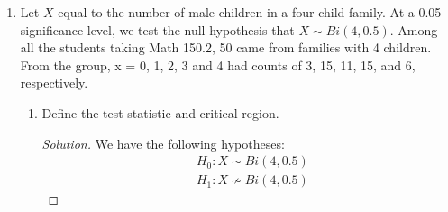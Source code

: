 \documentclass[12pt]{exam}
\begin{document}
\begin{enumerate}
    \begin{proof}[Solution]
        We have the following hypotheses:
        \begin{align*}
            &H_0: \sigma^2 - 140^2 = 0
            \\&H_1: \sigma^2 - 140^2 \neq 0
        \end{align*}
        Using MATLAB {\selectfont randi} function\(^1\), we got the following pseudorandom numbers: 479, 483, 78, 486, 479, 243, 400, and 71. 

        Solving for \(s^2\), we have
        \begin{align*}
            n &= 8
            \\\overline{x} &= 339.875
            \\s^2 &= \dfrac{1}{7}\sum_{i=1}^8 (x_i - 339.875)^2 = 33488.696
        \end{align*}
        Hence, the \(\chi^2-\)statistic is
        \begin{align*}
            \chi^2 = \dfrac{(n-1)s^2}{\sigma_0^2} = 11.96
        \end{align*}
        Moreover, given \(\alpha = 0.05\) and \(df = 7\), we have the following critical values
        \begin{align*}
            \chi^2_{0.975,7} &= 1.690
            \\\chi^2_{0.025,7} &= 16.013
        \end{align*}
        and since \(\chi^2 = 11.96 \in (1.690, 16.013)\), we do not reject \(H_0\). That is, there is sufficient evidence that the standard deviation of the eight randomly generated numbers is not different from 140.
    \end{proof}

    \item Let \(X\) equal to the number of male children in a four-child family. At a 0.05 significance level, we test the null hypothesis that \(X \sim Bi(4, 0.5)\). Among all the students taking Math 150.2, 50 came from families with 4 children. From the group, x = 0, 1, 2, 3 and 4 had counts of 3, 15, 11, 15, and 6, respectively.
    \begin{enumerate}
        \item Define the test statistic and critical region.
        \begin{proof}[Solution]
            We have the following hypotheses:
            \begin{align*}
                & H_0: X\sim Bi(4,0.5) \\
                & H_1: X\not\sim Bi(4,0.5)
            \end{align*}


\end{proof}
\end{enumerate}
\end{enumerate}
\end{document}
